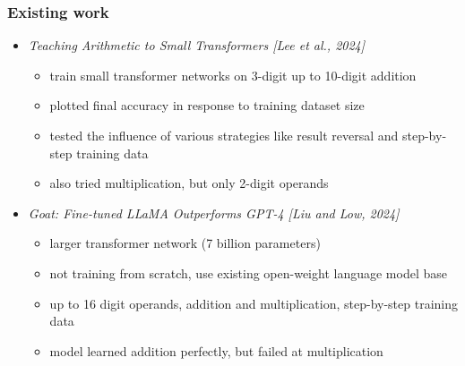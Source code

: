 \documentclass{beamer}
\begin{document}
\begin{frame}
\frametitle{Existing work}
\begin{itemize}
    \item \textit{Teaching Arithmetic to Small Transformers [Lee et al., 2024]}
    \begin{itemize}
        \item train small transformer networks on 3-digit up to 10-digit addition
        \item plotted final accuracy in response to training dataset size
        \item tested the influence of various strategies like result reversal and step-by-step training data
        \item also tried multiplication, but only 2-digit operands
    \end{itemize}
    \item \textit{Goat: Fine-tuned LLaMA Outperforms GPT-4 [Liu and Low, 2024]}
    \begin{itemize}
        \item larger transformer network (7 billion parameters)
        \item not training from scratch, use existing open-weight language model base
        \item up to 16 digit operands, addition and multiplication, step-by-step training data
        \item model learned addition perfectly, but failed at multiplication
    \end{itemize}
\end{itemize}
\end{frame}
\end{document}
